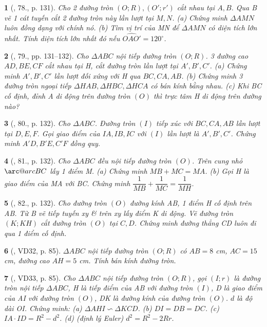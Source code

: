 \documentclass{article}
\makeatletter
\newcommand{\arc@char}{{\usefont{U}{tipa}{m}{n}\symbol{62}}}%
\newcommand{\arc}[1]{\mathpalette\arc@arc{#1}}
\newcommand{\arc@arc}[2]{%
	\sbox0{$\m@th#1#2$}%
	\vbox{
		\hbox{\resizebox{\wd0}{\height}{\arc@char}}
		\nointerlineskip
		\box0
	}%
}
\newtheorem{baitoan}{}
\makeatother
\begin{document}
\begin{baitoan}[\cite{Tuyen_Toan_9_old}, 78., p. 131]
	Cho 2 đường tròn $(O;R),(O';r')$ cắt nhau tại $A,B$. Qua B vẽ 1 cát tuyến cắt 2 đường tròn này lần lượt tại $M,N$. (a) Chứng minh $\Delta AMN$ luôn đồng dạng với chính nó. (b) Tìm vị trí của MN để $\Delta AMN$ có diện tích lớn nhất. Tính diện tích lớn nhất đó nếu $\widehat{OAO'} = 120^\circ$.
\end{baitoan}

\begin{baitoan}[\cite{Tuyen_Toan_9_old}, 79., pp. 131--132]
	Cho $\Delta ABC$ nội tiếp đường tròn $(O;R)$. 3 đường cao $AD,BE,CF$ cắt nhau tại H, cắt đường tròn lần lượt tại $A',B',C'$. (a) Chứng minh $A',B',C'$ lần lượt đối xứng với H qua $BC,CA,AB$. (b) Chứng minh 3 đường tròn ngoại tiếp $\Delta HAB,\Delta HBC,\Delta HCA$ có bán kính bằng nhau. (c) Khi BC cố định, đỉnh A di động trên đường tròn $(O)$ thì trực tâm H di động trên đường nào?
\end{baitoan}

\begin{baitoan}[\cite{Tuyen_Toan_9_old}, 80., p. 132]
	Cho $\Delta ABC$. Đường tròn $(I)$ tiếp xúc với $BC,CA,AB$ lần lượt tại $D,E,F$. Gọi giao điểm của $IA,IB,IC$ với $(I)$ lần lượt là $A',B',C'$. Chứng minh $A'D,B'E,C'F$ đồng quy.
\end{baitoan}

\begin{baitoan}[\cite{Tuyen_Toan_9_old}, 81., p. 132]
	Cho $\Delta ABC$ đều nội tiếp đường tròn $(O)$. Trên cung nhỏ $\arc{BC}$ lấy 1 điểm M. (a) Chứng minh $MB + MC = MA$. (b) Gọi H là giao điểm của MA với BC. Chứng minh $\dfrac{1}{MB} + \dfrac{1}{MC} = \dfrac{1}{MH}$.
\end{baitoan}

\begin{baitoan}[\cite{Tuyen_Toan_9_old}, 82., p. 132]
	Cho đường tròn $(O)$ đường kính AB, 1 điểm H cố định trên AB. Từ B vẽ tiếp tuyến xy \& trên xy lấy điểm K di động. Vẽ đường tròn $(K;KH)$ cắt đường tròn $(O)$ tại $C,D$. Chứng minh đường thẳng CD luôn đi qua 1 điểm cố định.
\end{baitoan}

\begin{baitoan}[\cite{Binh_Toan_9_tap_2}, VD32, p. 85]
	$\Delta ABC$ nội tiếp đường tròn $(O;R)$ có $AB = 8$ {\rm cm}, $AC = 15$ {\rm cm}, đường cao $AH = 5$ {\rm cm}. Tính bán kính đường tròn.
\end{baitoan}

\begin{baitoan}[\cite{Binh_Toan_9_tap_2}, VD33, p. 85]
	Cho $\Delta ABC$ nội tiếp đường tròn $(O;R)$, gọi $(I;r)$ là đường tròn nội tiếp $\Delta ABC$, H là tiếp điểm của AB với đường tròn $(I)$, D là giao điểm của AI với đường tròn $(O)$, DK là đường kính của đường tròn $(O)$. $d$ là độ dài OI. Chứng minh: (a) $\Delta AHI\backsim\Delta KCD$. (b) $DI = DB = DC$. (c) $IA\cdot ID = R^2 - d^2$. (d) {\rm(định lý Euler)} $d^2 = R^2 - 2Rr$.
\end{baitoan}
\end{document}
